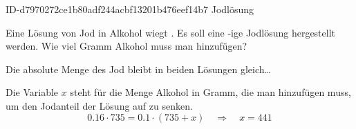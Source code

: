 \begin{exercise}
      {ID-d7970272ce1b80adf244acbf13201b476eef14b7}
      {Jodlösung}
  \ifproblem\problem\par
    Eine Lösung von  Jod in Alkohol wiegt .
    Es soll eine -ige Jodlösung hergestellt werden.
    Wie viel Gramm Alkohol muss man hinzufügen?
  \fi
  \ifoutline\outline\par
    Die absolute Menge des Jod bleibt in beiden Lösungen gleich\ldots
  \fi
  \ifoutcome\outcome\par
    Die Variable $x$ steht für die Menge Alkohol in Gramm, die man hinzufügen
    muss, um den Jodanteil der Lösung auf  zu senken.
    \begin{equation*}
      \num{0.16}\cdot 735=\num{0.1}\cdot(735+x)
      \quad\Rightarrow\quad
      x=441
    \end{equation*}
  \fi
\end{exercise}
